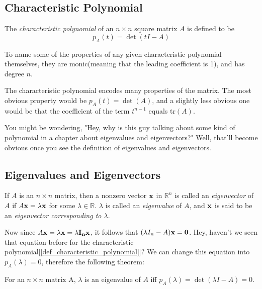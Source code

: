 \documentclass{report}
\begin{document}
		\subsection{Characteristic Polynomial}
			\begin{defn}\label{def_characteristic_polynomial}
				The \emph{characteristic polynomial} of an $n \times n$ square matrix $A$ is defined to be
				\begin{displaymath}
					p_A(t)=\det(tI-A)
				\end{displaymath}
			\end{defn}
			To name some of the properties of any given characteristic polynomial themselves, they are monic(meaning that the leading coefficient is 1), and has degree $n$.
			
			The characteristic polynomial encodes many properties of the matrix. The most obvious property would be $p_A(t)=\det(A)$, and a slightly less obvious one would be that the coefficient of the term $t^{n-1}$ equals tr$(A)$.
			
			You might be wondering, "Hey, why is this guy talking about some kind of polynomial in a chapter about eigenvalues and eigenvectors?" Well, that'll become obvious once you see the definition of eigenvalues and eigenvectors.
		
		\subsection{Eigenvalues and Eigenvectors}
		\begin{defn}
			If $A$ is an $n \times n$ matrix, then a nonzero vector $\bf{x}$ in $\mathbb{R}^n$ is called an \emph{eigenvector} of $A$ if $A\bf{x}=\lambda \bf{x}$ for some $\lambda \in \mathbb{R}$. $\lambda$ is called an \emph{eigenvalue} of $A$, and $\bf{x}$ is said to be an \emph{eigenvector corresponding to $\lambda$}.
		\end{defn}
		
		Now since $A\bf{x}=\lambda \bf{x}=\lambda I_n \bf{x}$, it follows that $(\lambda I_n - A)\bf{x}=\bf{0}$. Hey, haven't we seen that equation before for the characteristic polynomial[\ref{def_characteristic_polynomial}]? We can change this equation into $p_A(\lambda)=0$, therefore the following theorem:
		
		\begin{thm}
			For an $n \times n$ matrix A, $\lambda$ is an eigenvalue of $A$ iff $p_A(\lambda)=\det(\lambda I-A)=0$.
		\end{thm}
		
\end{document}
